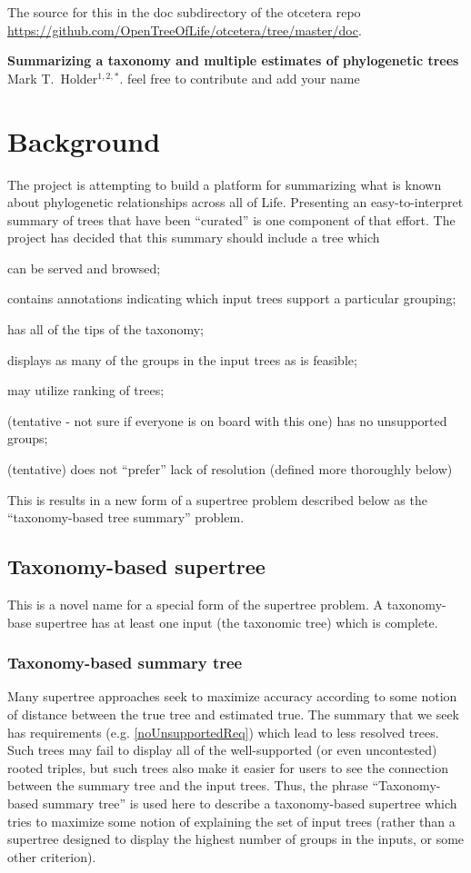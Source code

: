 \documentclass[11pt]{article}
\begin{document}
The source for this in the doc subdirectory of the otcetera
    repo \url{https://github.com/OpenTreeOfLife/otcetera/tree/master/doc}.
\begin{center}
    {\bf Summarizing a taxonomy and multiple estimates of phylogenetic trees} \\
{Mark T.~Holder$^{1,2,\ast}$. feel free to contribute and add your name}
\end{center}
\tableofcontents
\section{Background}
The \otol project is attempting to build a platform for summarizing what is known
    about phylogenetic relationships across all of Life.
Presenting an easy-to-interpret summary of trees that have been ``curated''
    is one component of that effort.
The project has decided that this summary should include a tree which
\begin{compactenum}
    \item can be served and browsed;
    \item contains annotations indicating which input trees support a particular grouping;
    \item has all of the tips of the taxonomy;
    \item displays as many of the groups in the input trees as is feasible;
    \item may utilize ranking of trees;
    \item (tentative - not sure if everyone is on board with this one) has no unsupported groups;\label{noUnsupportedReq}
    \item (tentative) does not ``prefer'' lack of resolution (defined more thoroughly below)
\end{compactenum}
This is results in a new form of a supertree problem described below as the ``taxonomy-based tree summary'' problem.
\subsection{Taxonomy-based supertree}
This is a novel name for a special form of the supertree problem.
A taxonomy-base supertree has at least one input (the taxonomic tree) which is complete.
\subsubsection{Taxonomy-based summary tree}
Many supertree approaches seek to maximize accuracy according to some notion
    of distance between the true tree and estimated true.
The summary that we seek has requirements (e.g. \ref{noUnsupportedReq})
    which lead to less resolved trees.
Such trees may fail to display all of the well-supported (or even uncontested)
    rooted triples, but such trees also make it easier for users to see the
    connection between the summary tree and the input trees.
Thus, the phrase ``Taxonomy-based summary tree'' is used here to describe a
    taxonomy-based supertree which tries to maximize some notion of
    explaining the set of input trees (rather than a supertree designed to
    display the highest number of groups in the inputs, or some other criterion).
\end{document}
